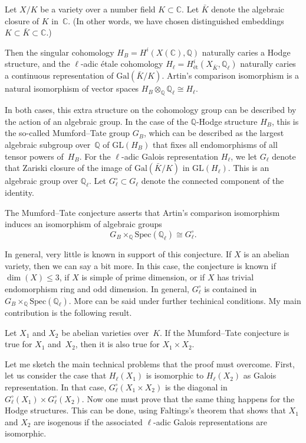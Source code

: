 Let $X/K$ be a variety over a number field $K \subset \mathbb C$.
Let $\bar K$ denote the algebraic closure of $K$ in~$\mathbb C$.
(In other words, we have chosen distinguished embeddings $K \subset \bar K \subset \mathbb C$.)

Then the singular cohomology $H_B = H^i(X(\mathbb C), \mathbb Q)$ naturally caries a Hodge structure,
and the $\ell$-adic \'etale cohomology $H_\ell = H_{\text{\'et}}^i(X_{\bar K}, \mathbb Q_\ell)$
naturally caries a continuous representation of $\text{Gal}(\bar K/K)$.
Artin's comparison isomorphism is a natural isomorphism of vector spaces
$H_B \otimes_{\mathbb Q} \mathbb Q_\ell \cong H_\ell$.

In both cases, this extra structure on the cohomology group can be described by the action of an algebraic group.
In the case of the $\mathbb Q$-Hodge structure $H_B$,
this is the so-called Mumford--Tate group $G_B$,
which can be described as the largest algebraic subgroup over~$\mathbb Q$ of $\text{GL}(H_B)$
that fixes all endomorphisms of all tensor powers of~$H_B$.
For the $\ell$-adic Galois representation $H_\ell$,
we let $G_\ell$ denote that Zariski closure of the image of $\text{Gal}(\bar K/K)$ in $\text{GL}(H_\ell)$.
This is an algebraic group over $\mathbb Q_\ell$.
Let $G_\ell^\circ \subset G_\ell$ denote the connected component of the identity.

The Mumford--Tate conjecture asserts that
Artin's comparison isomorphism induces an isomorphism of algebraic groups
\[
 G_B \times_{\mathbb Q} \text{Spec}(\mathbb Q_\ell) \cong G_\ell^\circ.
\]

In general, very little is known in support of this conjecture.
If $X$ is an abelian variety, then we can say a bit more.
In this case, the conjecture is known if $\dim(X) \le 3$,
if $X$ is simple of prime dimension, or if $X$ has trivial endomorphism ring and odd dimension.
In general, $G_\ell^\circ$ is contained in $G_B \times_{\mathbb Q} \text{Spec}(\mathbb Q_\ell)$.
More can be said under further techinical conditions.
My main contribution is the following result.

\begin{thm}[Commelin, 2019]
 Let $X_1$ and $X_2$ be abelian varieties over~$K$.
 If the Mumford--Tate conjecture is true for $X_1$ and~$X_2$,
 then it is also true for $X_1 \times X_2$.
\end{thm}

Let me sketch the main technical problems that the proof must overcome.
First, let us consider the case that $H_\ell(X_1)$ is isomorphic to $H_\ell(X_2)$ as Galois representation.
In that case, $G_\ell^\circ(X_1 \times X_2)$ is the diagonal in $G_\ell^\circ(X_1) \times G_\ell^\circ(X_2)$.
Now one must prove that the same thing happens for the Hodge structures.
This can be done, using Faltings's theorem that shows that $X_1$ and $X_2$ are isogenous
if the associated $\ell$-adic Galois representations are isomorphic.

